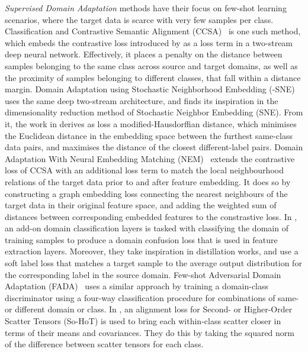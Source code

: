 \documentclass[journal]{IEEEtran}
\begin{document}
\textit{Supervised Domain Adaptation} methods have their focus on few-shot learning scenarios, where the target data is scarce with very few samples per class. 
Classification and Contrastive Semantic Alignment (CCSA)~\cite{motiian2017ccsa} is one such method, which embeds the contrastive loss introduced by \citet{hadsell2006dimensionality} as a loss term in a two-stream deep neural network. Effectively, it places a penalty on the distance between samples belonging to the same class across source and target domains, as well as the proximity of samples belonging to different classes, that fall within a distance margin.
Domain Adaptation using Stochastic Neighborhood Embedding (-SNE)~\cite{xu2019dsne} uses the same deep two-stream architecture, and finds its inspiration in the dimensionality reduction method of Stochastic Neighbor Embedding (SNE). From it, the work in \cite{xu2019dsne} derives as loss a modified-Hausdorffian distance, which minimises the Euclidean distance in the embedding space between the furthest same-class data pairs, and maximises the distance of the closest different-label pairs.
Domain Adaptation With Neural Embedding Matching (NEM)~\cite{wang2019nem} extends the contrastive loss of CCSA with an additional loss term to match the local neighbourhood relations of the target data prior to and after feature embedding. It does so by constructing a graph embedding loss connecting the nearest neighbours of the target data in their original feature space, and adding the weighted sum of distances between corresponding embedded features to the constrastive loss.
In \cite{tzeng2015simultaneous}, an add-on domain classification layers is tasked with classifying the domain of training samples to produce a domain confusion loss that is used in feature extraction layers. Moreover, they take inspiration in distillation works, and use a soft label loss that matches a target sample to the average output distribution for the corresponding label in the source domain.
Few-shot Adversarial Domain Adaptation (FADA)~\cite{motiian2017fada} uses a similar approach by training a domain-class discriminator using a four-way classification procedure for combinations of same- or different domain or class.
In \cite{koniusz2017domain}, an alignment loss for Second- or Higher-Order Scatter Tensors (So-HoT) is used to bring each within-class scatter closer in terms of their means and covariances. They do this by taking the squared norm of the difference between scatter tensors for each class.
\end{document}
